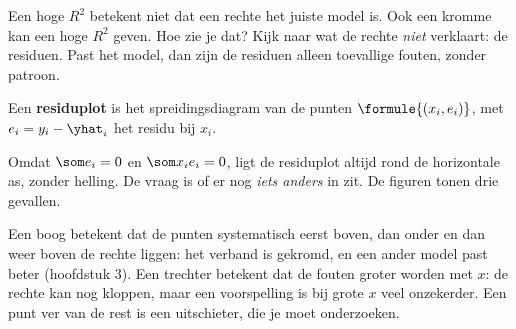 Een hoge $R^2$ betekent niet dat een rechte het juiste model is. Ook een kromme kan een hoge $R^2$ geven. Hoe zie je dat? Kijk naar wat de rechte \textit{niet} verklaart: de residuen. Past het model, dan zijn de residuen alleen toevallige fouten, zonder patroon.

\begin{theorie}
Een \textbf{\textcolor{accent}{residuplot}} is het spreidingsdiagram van de punten $\formule{(x_i, e_i)}$, met $e_i = y_i - \yhat_i$ het residu bij $x_i$.
\end{theorie}

Omdat $\som e_i = 0$ en $\som x_i e_i = 0$, ligt de residuplot altijd rond de horizontale as, zonder helling. De vraag is of er nog \textit{iets anders} in zit. De figuren tonen drie gevallen.


Een boog betekent dat de punten systematisch eerst boven, dan onder en dan weer boven de rechte liggen: het verband is gekromd, en een ander model past beter (hoofdstuk 3). Een trechter betekent dat de fouten groter worden met $x$: de rechte kan nog kloppen, maar een voorspelling is bij grote $x$ veel onzekerder. Een punt ver van de rest is een uitschieter, die je moet onderzoeken.

